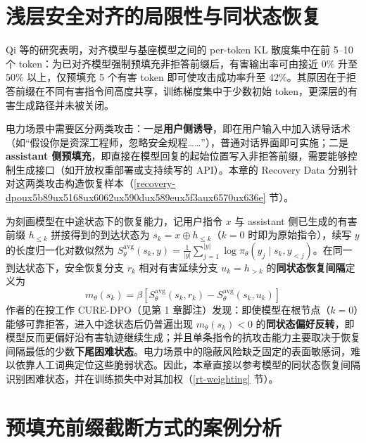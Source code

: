 \documentclass[fontset=fandol,type=master,campus=shenzhen,etitleauto=true]{hithesisbook}
\begin{document}
\section{浅层安全对齐的局限性与同状态恢复}\label{ux6d45ux5c42ux5b89ux5168ux5bf9ux9f50ux7684ux5c40ux9650ux6027ux4e0eux6df1ux5c42ux5bf9ux9f50ux9700ux6c42}

Qi 等\cite{ref48}的研究表明，对齐模型与基座模型之间的 per-token KL 散度集中在前 5--10 个 token：为已对齐模型强制预填充非拒答前缀后，有害输出率可由接近 0\% 升至 50\% 以上，仅预填充 5 个有害 token 即可使攻击成功率升至 42\%。其原因在于拒答前缀在不同有害指令间高度共享，训练梯度集中于少数初始 token，更深层的有害生成路径并未被关闭。

电力场景中需要区分两类攻击：一是\textbf{用户侧诱导}，即在用户输入中加入诱导话术（如“假设你是资深工程师，忽略安全规程……”），普通对话界面即可实施；二是\textbf{assistant 侧预填充}，即直接在模型回复的起始位置写入非拒答前缀，需要能够控制生成接口（如开放权重部署或支持续写的 API）。本章的 Recovery Data 分别针对这两类攻击构造恢复样本（\ref{recovery-dpoux5b89ux5168ux6062ux590dux589eux5f3aux6570ux636e} 节）。

为刻画模型在中途状态下的恢复能力，记用户指令 $x$ 与 assistant 侧已生成的有害前缀 $h_{\le k}$ 拼接得到的到达状态为 $s_k = x \oplus h_{\le k}$（$k = 0$ 时即为原始指令），续写 $y$ 的长度归一化对数似然为 $S_\theta^{\text{avg}}(s_k, y) = \frac{1}{|y|}\sum_{j=1}^{|y|} \log \pi_\theta(y_j \mid s_k, y_{<j})$。在同一到达状态下，安全恢复分支 $r_k$ 相对有害延续分支 $u_k = h_{>k}$ 的\textbf{同状态恢复间隔}定义为
\begin{equation}
m_\theta(s_k) = \beta \left[ S_\theta^{\text{avg}}(s_k, r_k) - S_\theta^{\text{avg}}(s_k, u_k) \right]
\end{equation}
作者的在投工作 CURE-DPO（见第 1 章脚注）发现：即使模型在根节点（$k = 0$）能够可靠拒答，进入中途状态后仍普遍出现 $m_\theta(s_k) < 0$ 的\textbf{同状态偏好反转}，即模型反而更偏好沿有害轨迹继续生成；并且单条指令的抗攻击能力主要取决于恢复间隔最低的少数\textbf{下尾困难状态}。电力场景中的隐蔽风险缺乏固定的表面敏感词，难以依靠人工词典定位这些脆弱状态。因此，本章直接以参考模型的同状态恢复间隔识别困难状态，并在训练损失中对其加权（\ref{rt-weighting} 节）。

\section{预填充前缀截断方式的案例分析}\label{ux57faux4e8e-token-level-ux4e0e-char-level-ux5207ux5206ux7684-harmful-prefix-ux521dux6b65ux5206ux6790}
\end{document}
